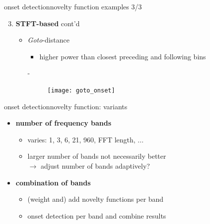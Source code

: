         \begin{frame}{onset detection}{novelty function examples 3/3}
            \begin{enumerate}   
                \setcounter{enumi}{2}
                \item	\textbf{STFT-based} cont'd 
                    \begin{itemize}
                        \item<1->	\textit{Goto}-distance
                            \begin{itemize}
                                \item	higher power than closest preceding and following bins
                            \end{itemize}
                        -
                        {							
                            \begin{figure}
                                \centering
                                \texttt{[image: goto\_onset]}
                            \end{figure}
                        }
                    \end{itemize}
            \end{enumerate}
        \end{frame}
        \begin{frame}{onset detection}{novelty function: variants}
            \begin{itemize}
                \item	\textbf{number of frequency bands}
                    \begin{itemize}
                        \item	varies: 1, 3, 6, 21, 960, FFT length, ...
                        \item<2->	larger number of bands not necessarily better\\ $\rightarrow$ adjust number of bands adaptively?
                    \end{itemize}
                \bigskip
                \item<3->	\textbf{combination of bands}
                    \begin{itemize}
                        \item	(weight and) add novelty functions per band
                        \item<4->	onset detection per band and combine results
                    \end{itemize}
            \end{itemize}
        \end{frame}
